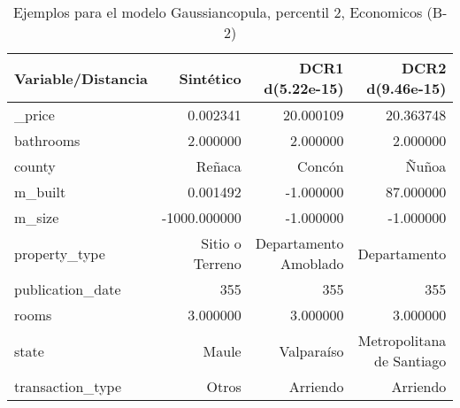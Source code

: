 \begin{table}[H]
\centering
\fontsize{10}{14}\selectfont
\caption{Ejemplos para el modelo Gaussiancopula, percentil 2, Economicos (B-2)}
\label{table-example-economicos-b-2-gaussiancopula-2p}
\begin{tabular}{|l|r|r|r|}
\hline
\rowcolor[gray]{0.8}
Variable/Distancia & Sintético & DCR1 d(5.22e-15) & DCR2 d(9.46e-15) \\
\hline \_price & \cellcolor[rgb]{0.9, 0.54, 0.52} 0.002341 & 20.000109 & 20.363748 \\
\hline bathrooms & \cellcolor[rgb]{0.9, 0.54, 0.52} 2.000000 & \cellcolor[rgb]{0.9, 0.54, 0.52} 2.000000 & \cellcolor[rgb]{0.9, 0.54, 0.52} 2.000000 \\
\hline county & \cellcolor[rgb]{0.9, 0.54, 0.52} Reñaca & Concón & Ñuñoa \\
\hline m\_built & \cellcolor[rgb]{0.9, 0.54, 0.52} 0.001492 & \cellcolor[rgb]{0.9, 0.54, 0.52} -1.000000 & 87.000000 \\
\hline m\_size & \cellcolor[rgb]{0.9, 0.54, 0.52} -1000.000000 & \cellcolor[rgb]{0.9, 0.54, 0.52} -1.000000 & \cellcolor[rgb]{0.9, 0.54, 0.52} -1.000000 \\
\hline property\_type & \cellcolor[rgb]{0.9, 0.54, 0.52} Sitio o Terreno & Departamento Amoblado & Departamento \\
\hline publication\_date & \cellcolor[rgb]{0.9, 0.54, 0.52} 355 & \cellcolor[rgb]{0.9, 0.54, 0.52} 355 & \cellcolor[rgb]{0.9, 0.54, 0.52} 355 \\
\hline rooms & \cellcolor[rgb]{0.9, 0.54, 0.52} 3.000000 & \cellcolor[rgb]{0.9, 0.54, 0.52} 3.000000 & \cellcolor[rgb]{0.9, 0.54, 0.52} 3.000000 \\
\hline state & \cellcolor[rgb]{0.9, 0.54, 0.52} Maule & Valparaíso & Metropolitana de Santiago \\
\hline transaction\_type & \cellcolor[rgb]{0.9, 0.54, 0.52} Otros & Arriendo & Arriendo \\
\hline
\end{tabular}
\end{table}
